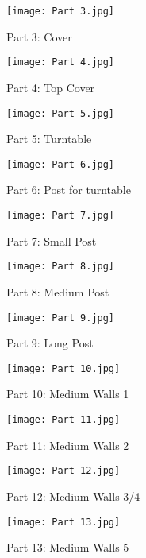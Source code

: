 \documentclass[12pt, titlepage]{article}
\begin{document}
\begin{figure}[H]
    \centerline{\texttt{[image: Part 3.jpg]}}
    \caption{Part 3: Cover}
    \label{fig}
\end{figure}

\begin{figure}[H]
    \centerline{\texttt{[image: Part 4.jpg]}}
    \caption{Part 4: Top Cover}
    \label{fig}
\end{figure}

\begin{figure}[H]
    \centerline{\texttt{[image: Part 5.jpg]}}
    \caption{Part 5: Turntable}
    \label{fig}
\end{figure}

\begin{figure}[H]
    \centerline{\texttt{[image: Part 6.jpg]}}
    \caption{Part 6: Post for turntable}
    \label{fig}
\end{figure}

\begin{figure}[H]
    \centerline{\texttt{[image: Part 7.jpg]}}
    \caption{Part 7: Small Post}
    \label{fig}
\end{figure}

\begin{figure}[H]
    \centerline{\texttt{[image: Part 8.jpg]}}
    \caption{Part 8: Medium Post}
    \label{fig}
\end{figure}

\begin{figure}[H]
    \centerline{\texttt{[image: Part 9.jpg]}}
    \caption{Part 9: Long Post}
    \label{fig}
\end{figure}

\begin{figure}[H]
    \centerline{\texttt{[image: Part 10.jpg]}}
    \caption{Part 10: Medium Walls 1}
    \label{fig}
\end{figure}

\begin{figure}[H]
    \centerline{\texttt{[image: Part 11.jpg]}}
    \caption{Part 11: Medium Walls 2}
    \label{fig}
\end{figure}

\begin{figure}[H]
    \centerline{\texttt{[image: Part 12.jpg]}}
    \caption{Part 12: Medium Walls 3/4}
    \label{fig}
\end{figure}

\begin{figure}[H]
    \centerline{\texttt{[image: Part 13.jpg]}}
    \caption{Part 13: Medium Walls 5}
    \label{fig}
\end{figure}
\end{document}
